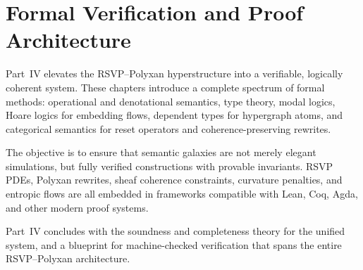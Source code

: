 \part{Formal Verification and Proof Architecture}

Part~IV elevates the RSVP--Polyxan hyperstructure into a verifiable,
logically coherent system. These chapters introduce a complete spectrum
of formal methods: operational and denotational semantics, type theory,
modal logics, Hoare logics for embedding flows, dependent types for
hypergraph atoms, and categorical semantics for reset operators and
coherence-preserving rewrites.

The objective is to ensure that semantic galaxies are not merely elegant
simulations, but fully verified constructions with provable invariants.
RSVP PDEs, Polyxan rewrites, sheaf coherence constraints, curvature
penalties, and entropic flows are all embedded in frameworks compatible
with Lean, Coq, Agda, and other modern proof systems.

Part~IV concludes with the soundness and completeness theory for the
unified system, and a blueprint for machine-checked verification that
spans the entire RSVP--Polyxan architecture.

\cleardoublepage

